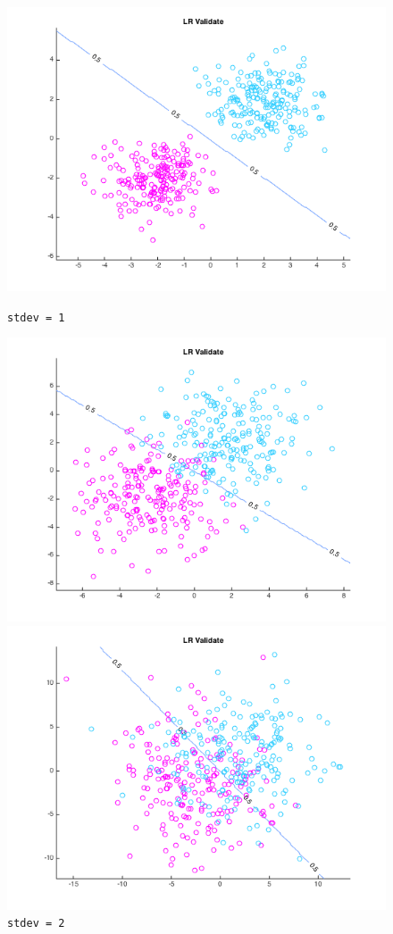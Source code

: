 \documentclass[10pt,letterpaper]{article}
\begin{document}
\begin{figure}[!htb]
  \includegraphics[width=\linewidth]{figures/sd1v2.png}
  \caption{\texttt{stdev = 1}}\label{fig:gradDifQ}
\endminipage\hfill
{}
  \includegraphics[width=\linewidth]{figures/sd2v20.png}
  \caption{\texttt{stdev = 2}}\label{fig:gradDifN}
\endminipage\hfill
{}
  \includegraphics[width=\linewidth]{figures/sd4v20.png}

\end{figure}
\end{document}
